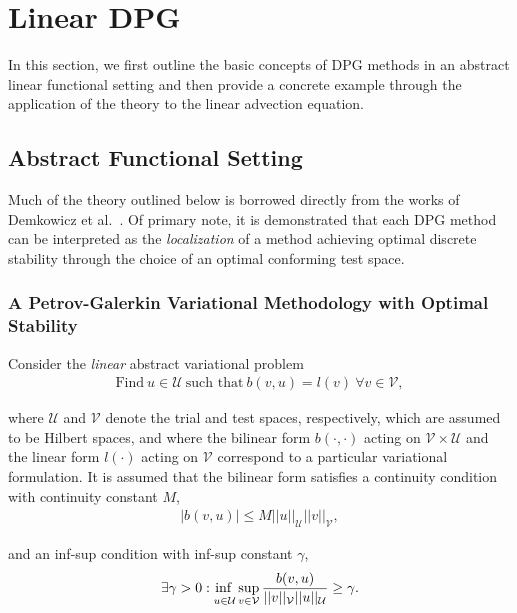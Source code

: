 \section{Linear DPG} \label{sec:dpg_linear}

In this section, we first outline the basic concepts of DPG methods in an abstract linear functional setting and then
provide a concrete example through the application of the theory to the linear advection equation.

\subsection{Abstract Functional Setting}

Much of the theory outlined below is borrowed directly from the works of Demkowicz et
al.~\cite{Demkowicz2014_overview,Demkowicz2017}. Of primary note, it is demonstrated that each DPG method can be
interpreted as the \emph{localization} of a method achieving optimal discrete stability through the choice of an
optimal conforming test space.

\subsubsection{A Petrov-Galerkin Variational Methodology with Optimal Stability}
\label{sec:PG_aspect_of_DPG}

Consider the \emph{linear} abstract variational problem
\begin{align} \label{eq:bilinear_abstract_infinite}
\text{Find}\ u \in \mathcal{U}\ \text{such that}\
b(v,u) = l(v)\ \forall v \in \mathcal{V},
\end{align}

where $\mathcal{U}$ and $\mathcal{V}$ denote the trial and test spaces, respectively, which are assumed to be Hilbert
spaces, and where the bilinear form $b(\cdot,\cdot)$ acting on $\mathcal{V} \times \mathcal{U}$ and the linear form
$l(\cdot)$ acting on $\mathcal{V}$ correspond to a particular variational formulation. It is assumed that the bilinear form
satisfies a continuity condition with continuity constant $M$,
\begin{align}
| b(v,u) | \le M ||u||_{\mathcal{U}} ||v||_{\mathcal{V}},
\end{align}

and an inf-sup condition with inf-sup constant $\gamma$,
\begin{align} \label{eq:inf_sup_infinite}
\exists \gamma > 0 :
\adjustlimits\inf_{u\in\mathcal{U}} \sup_{v\in\mathcal{V}}
\frac{b(v,u)}{||v||_{\mathcal{V}}||u||_{\mathcal{U}}} \ge \gamma.
\end{align}

